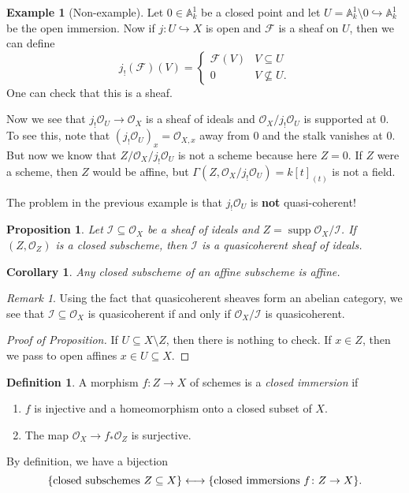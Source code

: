 \documentclass[leqno, openany]{memoir}
\newtheorem{cor}[thm]{Corollary}
\newtheorem{prop}[thm]{Proposition}
\theoremstyle{definition}
\newtheorem{defn}[thm]{Definition}
\newtheorem{exm}[thm]{Example}
\theoremstyle{remark}
\newtheorem{rmk}[thm]{Remark}
\theoremstyle{plain}
\theoremstyle{definition}
\theoremstyle{remark}
\newcommand{\A}{\mathbb{A}}
\newcommand{\mc}[1]{\mathcal{#1}}
\DeclareMathOperator{\supp}{supp}
\begin{document}
\begin{exm}[Non-example] Let $0 \in \A^1_k$ be a closed point and let $U =
    \A^1_k \setminus \qty{0} \hookrightarrow \A^1_k$ be the open immersion. Now
    if $j \colon U \hookrightarrow X$ is open and $\mc{F}$ is a sheaf on $U$,
    then we can define \[ j_! (\mc{F})(V) = \begin{cases} \mc{F}(V) & V
    \subseteq U \\ 0 & V \not\subseteq U.  \end{cases} \] One can check that
    this is a sheaf.
    
    Now we see that $j_! \mc{O}_U \to \mc{O}_X$ is a sheaf of ideals and
$\mc{O}_X/j_! \mc{O}_U$ is supported at $0$. To see this, note that ${ ( j_!
\mc{O}_U ) }_x = \mc{O}_{X,x}$ away from $0$ and the stalk vanishes at $0$. But
now we know that $Z/\mc{O}_X/j_! \mc{O}_U$ is not a scheme because here $Z =
\qty{0}$. If $Z$ were a scheme, then $Z$ would be affine, but $\Gamma(Z,
\mc{O}_X/j_! \mc{O}_U) = { k[t] }_(t)$ is not a field.  \end{exm}

The problem in the previous example is that $j_! \mc{O}_U$ is \textbf{not}
quasi-coherent!

\begin{prop} Let $\mc{I} \subseteq \mc{O}_X$ be a sheaf of ideals and $Z =
\supp \mc{O}_X/\mc{I}$. If $(Z, \mc{O}_Z)$ is a closed subscheme, then $\mc{I}$
is a quasicoherent sheaf of ideals.  \end{prop}

\begin{cor} Any closed subscheme of an affine subscheme is affine.  \end{cor}

\begin{rmk} Using the fact that quasicoherent sheaves form an abelian category,
we see that $\mc{I} \subseteq \mc{O}_X$ is quasicoherent if and only if
$\mc{O}_X/\mc{I}$ is quasicoherent.  \end{rmk}

\begin{proof}[Proof of Proposition] If $U \subseteq X \setminus Z$, then there
is nothing to check. If $x \in Z$, then we pass to open affines $x \in U
\subseteq X$.  \end{proof}

\begin{defn} A morphism $f \colon Z \to X$ of schemes is a \textit{closed
immersion} if \begin{enumerate} \item $f$ is injective and a homeomorphism onto
a closed subset of $X$.  \item The map $\mc{O}_X \to f_* \mc{O}_Z$ is
surjective.  \end{enumerate} By definition, we have a bijection \[
\qty{\text{closed subschemes }Z \subseteq X} \longleftrightarrow
\qty{\text{closed immersions } f \colon Z \to X}. \] \end{defn}
\end{document}
